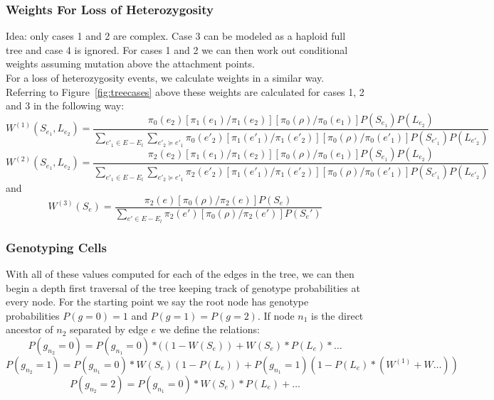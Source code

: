 \documentclass[../../main.tex]{subfiles}
\begin{document}
\subsubsection*{Weights For Loss of Heterozygosity}
Idea: only cases 1 and 2 are complex. Case 3 can be modeled as a haploid full tree and case 4 is ignored. For cases 1 and 2 we can then work out conditional weights assuming mutation above the attachment points.\\[1em]
For a loss of heterozygosity events, we calculate weights in a similar way. Referring to Figure~\ref{fig:treecases} above these weights are calculated for cases 1, 2 and 3 in the following way:
\begin{equation*}
W^{(1)}(S_{e_1},L_{e_2}) = \frac{\pi_0(e_2)\left[\pi_1(e_1)/\pi_1(e_2)\right]\left[\pi_0(\rho)/\pi_0(e_1)\right]P(S_{e_1})P(L_{e_2})}{\sum_{e'_1\in E-E_l}\sum_{e'_2\succeq e'_1}\pi_0(e'_2)\left[\pi_1(e'_1)/\pi_1(e'_2)\right]\left[\pi_0(\rho)/\pi_0(e'_1)\right]P(S_{e'_1})P(L_{e'_2})}
\end{equation*}
\begin{equation*}
W^{(2)}(S_{e_1},L_{e_2}) = \frac{\pi_2(e_2)\left[\pi_1(e_1)/\pi_1(e_2)\right]\left[\pi_0(\rho)/\pi_0(e_1)\right]P(S_{e_1})P(L_{e_2})}{\sum_{e'_1\in E-E_l}\sum_{e'_2\succeq e'_1}\pi_2(e'_2)\left[\pi_1(e'_1)/\pi_1(e'_2)\right]\left[\pi_0(\rho)/\pi_0(e'_1)\right]P(S_{e'_1})P(L_{e'_2})}
\end{equation*}
and
\begin{equation*}
W^{(3)}(S_e) = \frac{\pi_2(e)\left[\pi_0(\rho)/\pi_2(e)\right]P(S_e)}{\sum_{e'\in E-E_l}\pi_2(e')\left[\pi_0(\rho)/\pi_2(e')\right]P(S_e')}
\end{equation*}

\subsubsection*{Genotyping Cells}
With all of these values computed for each of the edges in the tree, we can then begin a depth first traversal of the tree keeping track of genotype probabilities at every node. For the starting point we say the root node has genotype probabilities $P(g=0)=1$ and $P(g=1)=P(g=2)$. If node $n_1$ is the direct ancestor of $n_2$ separated by edge $e$ we define the relations:
\begin{equation*}
P(g_{n_2} = 0) = P(g_{n_1}=0)*((1-W(S_e))+W(S_e)*P(L_e)*\dots
\end{equation*}
\begin{equation*}
P(g_{n_2} = 1) = P(g_{n_1}=0)*W(S_e)(1-P(L_e))+P(g_{n_1}=1)(1-P(L_e)*(W^{(1)}+W\dots))
\end{equation*}
\begin{equation*}
P(g_{n_2}=2) = P(g_{n_1}=0)*W(S_e)*P(L_e) + \dots
\end{equation*}
\end{document}
